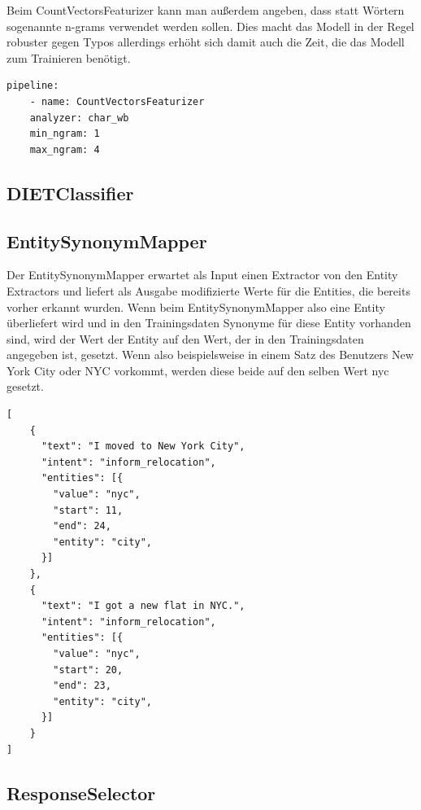 Beim CountVectorsFeaturizer kann man außerdem angeben, dass statt Wörtern sogenannte n-grams verwendet werden sollen.
Dies macht das Modell in der Regel robuster gegen Typos allerdings erhöht sich damit auch die Zeit, die das Modell zum Trainieren benötigt.\cite{countVectorsFeaturizer, pipelineConfigurationVideo, pipelineComponentsYoutube, rasaMasterclassCountVectorsFeaturizer}

\begin{lstlisting}[label={lst: CountVectorsFeaturizer with n-grams}]
pipeline:
    - name: CountVectorsFeaturizer
    analyzer: char_wb
    min_ngram: 1
    max_ngram: 4
\end{lstlisting}

\subsection{DIETClassifier}

\subsection{EntitySynonymMapper}

Der EntitySynonymMapper erwartet als Input einen Extractor von den Entity Extractors und liefert als Ausgabe modifizierte Werte für die Entities, die bereits vorher erkannt wurden.
Wenn beim EntitySynonymMapper also eine Entity überliefert wird und in den Trainingsdaten Synonyme für diese Entity vorhanden sind, wird der Wert der Entity auf den Wert, der in den Trainingsdaten angegeben ist, gesetzt.
Wenn also beispielsweise in einem Satz des Benutzers New York City oder NYC vorkommt, werden diese beide auf den selben Wert nyc gesetzt.\cite{entitySynonymMapper}

\begin{lstlisting}[label={lst: EntitySynonymMapper}]
[
    {
      "text": "I moved to New York City",
      "intent": "inform_relocation",
      "entities": [{
        "value": "nyc",
        "start": 11,
        "end": 24,
        "entity": "city",
      }]
    },
    {
      "text": "I got a new flat in NYC.",
      "intent": "inform_relocation",
      "entities": [{
        "value": "nyc",
        "start": 20,
        "end": 23,
        "entity": "city",
      }]
    }
]
\end{lstlisting}

\subsection{ResponseSelector}

